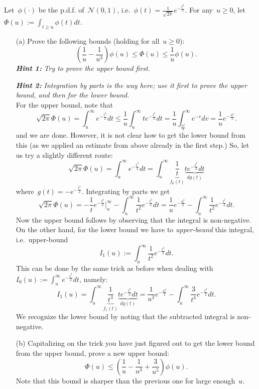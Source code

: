 \documentclass[11pt]{article}
\newcommand{\cN}{\mathcal{N}}
\newcommand{\leqs}{\leqslant}
\newcommand{\geqs}{\geqslant}
\renewcommand{\le}{\leqs}
\renewcommand{\ge}{\geqs}
\newcommand{\odima}[1]{{\color{red} #1}}
\begin{document}
Let~$\phi(\cdot)$ be the p.d.f. of~$\cN(0,1)$, i.e.~$\phi(t) = \frac{1}{\sqrt{2\pi}} e^{-\frac{t^2}{2}}$. For any~$u \ge 0$, let~$\Phi(u) := \int_{t \ge u} \phi(t) dt$.
\begin{itemize}
\item[(a)]
Prove the following bounds (holding for all~$u \ge 0$):
\[
\left( \frac{1}{u} - \frac{1}{u^3} \right) \phi(u) \le \Phi(u) \le \frac{1}{u} \phi(u).
\]
{\bf\em Hint 1:} {\em Try to prove the upper bound first.}

{\bf\em Hint 2:} {\em Integration by parts is the way here; use it first to prove the upper bound, and then for the lower bound.}\\

\odima{For the upper bound, note that
\[
\sqrt{2\pi} \Phi(u) = \int_{u}^{\infty} e^{-\frac{t^2}{2}} dt 
\le \frac{1}{u} \int_{u}^{\infty} t e^{-\frac{t^2}{2}} dt 
= \frac{1}{u} \int_{\frac{u^2}{2}}^{\infty} e^{-v} dv
= \frac{1}{u} e^{-\frac{u^2}{2}}.
\]
and we are done. However, it is not clear how to get the lower bound from this (as we applied an estimate from above already in the first step.) 
So, let us try a slightly different route: 
\[
\sqrt{2\pi} \Phi(u) = 
\int_{u}^{\infty} e^{-\frac{t^2}{2}} dt 
= \int_{u}^{\infty} \underbrace{\frac{1}{t}}_{f_0(t)} \underbrace{t e^{-\frac{t^2}{2}} dt}_{d g(t)}
\]
where~$g(t) = -e^{-\frac{t^2}{2}}$. Integrating by parts we get
\[
\sqrt{2\pi} \Phi(u) 
= -\frac{1}{t} e^{-\frac{t^2}{2}} \bigg|_{u}^{\infty} - \int_{u}^\infty \frac{1}{t^2} e^{-\frac{t^2}{2}} dt 
= \frac{1}{u} e^{-\frac{u^2}{2}} - \int_{u}^\infty \frac{1}{t^2} e^{-\frac{t^2}{2}} dt.
\]
Now the upper bound follows by observing that the integral is non-negative. 
On the other hand, for the lower bound we have to {\em upper-bound} this integral, i.e.~upper-bound
\[
I_1(u) := \int_{u}^\infty \frac{1}{t^2} e^{-\frac{t^2}{2}} dt.
\]
This can be done by the same trick as before when dealing with~$I_0(u) := \int_{u}^\infty e^{-\frac{t^2}{2}} dt$, namely:
\[
I_1(u) = \int_{u}^\infty \underbrace{\frac{1}{t^3}}_{f_1(t)} \underbrace{t e^{-\frac{t^2}{2}} dt}_{dg(t)} = 
\frac{1}{u^3} e^{-\frac{u^2}{2}} - \int_{u}^\infty \frac{3}{t^4} e^{-\frac{t^2}{2}} dt. 
\]
We recognize the lower bound by noting that the subtracted integral is non-negative.
}
\item[(b)] 
Capitalizing on the trick you have just figured out to get the lower bound from the upper bound, prove a new upper bound:
\[
\Phi(u) \le \left( \frac{1}{u} - \frac{1}{u^3} + \frac{3}{u^5} \right) \phi(u).
\]
Note that this bound is sharper than the previous one for large enough~$u$. 


\end{itemize}
\end{document}
